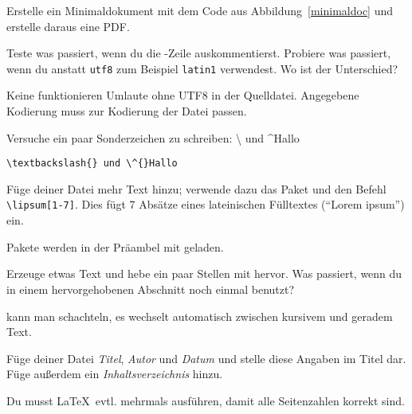 \begin{uebung}
\item Erstelle ein Minimaldokument mit dem Code aus 
	Abbildung~\ref{minimaldoc} und erstelle daraus eine PDF.\label{firststart:first}


	
\item Teste was passiert, wenn du die -Zeile auskommentierst.
    Probiere was passiert, wenn du anstatt \texttt{utf8} zum Beispiel
    \texttt{latin1} verwendest. Wo ist der Unterschied?\label{inputenc}
    \begin{loesung}
        Keine funktionieren Umlaute ohne UTF8 in der Quelldatei. Angegebene Kodierung muss zur Kodierung der Datei passen.
    \end{loesung}
    
\item Versuche ein paar Sonderzeichen zu schreiben: \textbackslash{} und
    \^{}Hallo\label{specialchars}
    \begin{loesung}
        \verb|\textbackslash{} und \^{}Hallo|
    \end{loesung}

\item Füge deiner Datei mehr Text hinzu; verwende dazu das Paket 
	 und den Befehl \verb+\lipsum[1-7]+. Dies fügt
	7 Absätze eines lateinischen Fülltextes (\enquote{Lorem ipsum}) ein.
	\begin{hinweis}
	    Pakete werden in der Präambel mit  geladen.
	\end{hinweis}\label{firststart:last}

\item Erzeuge etwas Text und hebe ein paar Stellen mit  hervor. Was
	passiert, wenn du in einem hervorgehobenen Abschnitt noch einmal \cmd{emph}
	benutzt?
	\label{markup:first}
	\label{markuplayout:first}
	\begin{loesung}
		 kann man schachteln, es wechselt automatisch zwischen
		kursivem und geradem Text.
	\end{loesung}

\item Füge deiner Datei \emph{Titel}, \emph{Autor} und 
	\emph{Datum} und stelle diese Angaben im Titel dar.
	Füge außerdem ein \emph{Inhaltsverzeichnis} hinzu.
	\begin{hinweis}
	    Du musst \LaTeX\ evtl. mehrmals ausführen, damit alle 
		Seitenzahlen korrekt sind.
	\end{hinweis}


\end{uebung}
